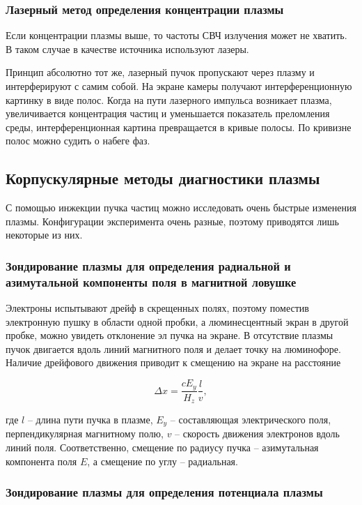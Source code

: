 \documentclass[10pt, a4paper]{article}
\begin{document}
\subsubsection{Лазерный метод определения концентрации плазмы}

Если концентрации плазмы выше, то частоты СВЧ излучения может не хватить. В таком случае в качестве источника используют лазеры.

Принцип абсолютно тот же, лазерный пучок пропускают через плазму и интерферируют с самим собой. На экране камеры получают интерференционную картинку в виде полос. Когда на пути лазерного импульса возникает плазма, увеличивается концентрация частиц и уменьшается показатель преломления среды, интерференционная картина превращается в кривые полосы. По кривизне полос можно судить о набеге фаз.

\subsection{Корпускулярные методы диагностики плазмы}

С помощью инжекции пучка частиц можно исследовать очень быстрые изменения плазмы. Конфигурации эксперимента очень разные, поэтому приводятся лишь некоторые из них.

\subsubsection{Зондирование плазмы для определения радиальной и азимутальной компоненты поля в магнитной ловушке}

Электроны испытывают дрейф в скрещенных полях, поэтому поместив электронную пушку в области одной пробки, а люминесцентный экран в другой пробке, можно увидеть отклонение эл пучка на экране. В отсутствие плазмы пучок двигается вдоль линий магнитного поля и делает точку на люминофоре. Наличие дрейфового движения приводит к смещению на экране на расстояние

\begin{equation}
	\Delta x=\frac{cE_y}{H_z}\frac{l}{v},
\end{equation}

где $l$ -- длина пути пучка в плазме, $E_y$ -- составляющая электрического поля, перпендикулярная магнитному полю, $v$ -- скорость движения электронов вдоль линий поля. Соответственно, смещение по радиусу пучка -- азимутальная компонента поля $E$, а смещение по углу -- радиальная.

\subsubsection{Зондирование плазмы для определения потенциала плазмы}
\end{document}
